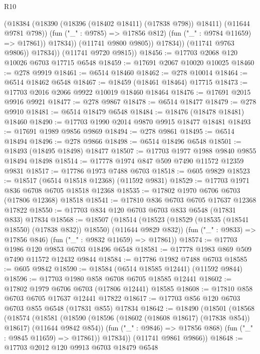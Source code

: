 \begin{lexlean}{R10}
\begin{coremodule}
                        (@18384
                          (@18390 (@18396 (@18402 @18411) (@17838 @798)) @18411)
                          (@11644 @9781 @798))
                        (fun ("_" : @9785) => @17856 @812)
                        (fun ("_" : @9784 @11659) => @17861))
                      @17834))
                  (@11741 @9800 @9805))
                @17834))
            (@11741 @9763 @9806))
          @17834))
      (@11741 @9720 @9815))
@18456 := @17703 @2068 @120 @10026 @6703 @17715 @6548
@18459 := @17691 @2067 @10020 @10025
@18460 := @278 @9919
@18461 := @6514 @18460
@18462 := @278 @10014
@18464 := @6514 @18462 @6548
@18467 := @18459 (@18461 @18464) @17715
@18473 := @17703 @2016 @2066 @9922 @10019 @18460 @18464
@18476 := @17691 @2015 @9916 @9921
@18477 := @278 @9867
@18478 := @6514 @18477
@18479 := @278 @9910
@18481 := @6514 @18479 @6548
@18484 := @18476 (@18478 @18481) @18460
@18490 := @17703 @1990 @2014 @9870 @9915 @18477 @18481
@18493 := @17691 @1989 @9856 @9869
@18494 := @278 @9861
@18495 := @6514 @18494
@18496 := @278 @9866
@18498 := @6514 @18496 @6548
@18501 := @18493 (@18495 @18498) @18477
@18507 := @17703 @1977 @1988 @9840 @9855 @18494 @18498
@18514 := @17778 @1974 @847 @509 @7490 @11572 @12359 @9831
@18517 := @17786 @1973 @7488 @6703
@18518 := @605 @9829
@18523 := @18517 (@6514 @18518 @12368) (@11592 @9831)
@18529 := @17703 @1971 @836 @6708 @6705 @18518 @12368
@18535 := @17802 @1970 @6706 @6703 (@17806 @12368) @18518
@18541 := @17810 @836 @6703 @6705 @17637 @12368 @17822
@18550 := @17703 @834 @120 @6703 @6703 @833 @6548 (@17831 @833) @17834
@18568 := @18507
    (@18514
      (@18523 (@18529 (@18535 (@18541 @18550) (@17838 @832)) @18550) (@11644 @9829 @832))
      (fun ("_" : @9833) => @17856 @846)
      (fun ("_" : @9832 @11659) => @17861))
@18574 := @17703 @1986 @120 @9853 @6703 @18496 @6548
@18581 := @17778 @1983 @869 @509 @7490 @11572 @12432 @9844
@18584 := @17786 @1982 @7488 @6703
@18585 := @605 @9842
@18590 := @18584 (@6514 @18585 @12441) (@11592 @9844)
@18596 := @17703 @1980 @858 @6708 @6705 @18585 @12441
@18602 := @17802 @1979 @6706 @6703 (@17806 @12441) @18585
@18608 := @17810 @858 @6703 @6705 @17637 @12441 @17822
@18617 := @17703 @856 @120 @6703 @6703 @855 @6548 (@17831 @855) @17834
@18642 := @18490
    (@18501
      (@18568
        (@18574
          (@18581
            (@18590 (@18596 (@18602 (@18608 @18617) (@17838 @854)) @18617) (@11644 @9842 @854))
            (fun ("_" : @9846) => @17856 @868)
            (fun ("_" : @9845 @11659) => @17861))
          @17834))
      (@11741 @9861 @9866))
@18648 := @17703 @2012 @120 @9913 @6703 @18479 @6548

\end{coremodule}
\end{lexlean}

